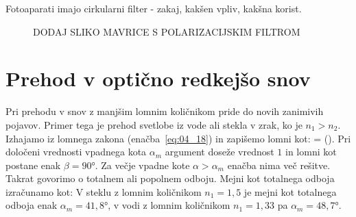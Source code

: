 \begin{remark}
Fotoaparati imajo cirkularni filter - zakaj, kakšen vpliv, kakšna korist.
\end{remark}
\begin{figure}[ht]
\centering
\caption{DODAJ SLIKO MAVRICE S POLARIZACIJSKIM FILTROM}
\label{fig:04_MavricaFoto}
\end{figure}

\section{Prehod v optično redkejšo snov}
Pri prehodu v snov z manjšim lomnim količnikom pride do novih zanimivih pojavov.
Primer tega je prehod svetlobe iz vode ali stekla v zrak, ko je $n_1>n_2$.
Izhajamo iz lomnega zakona (enačba~\ref{eq:04_18}) in zapišemo lomni kot:
\beq
\beta = \arcsin \left(\sin \alpha\right).
\label{eq:04_52}
\eeq
Pri določeni vrednosti vpadnega kota $\alpha_m$ 
argument doseže vrednost $1$ in lomni kot
postane enak $\beta = 90\si{\degree}$. Za večje vpadne kote 
$\alpha> \alpha_m$ enačba nima več rešitve. Takrat govorimo o totalnem 
ali popolnem odboju. Mejni kot totalnega odboja izračunamo kot:
V steklu z lomnim količnikom $n_1=1,5$ je mejni kot totalnega odboja
enak $\alpha_m = 41,8\si{\degree}$, v vodi z lomnim količnikom 
$n_1 = 1,33$ pa $\alpha_m = 48,7\si{\degree}$.

